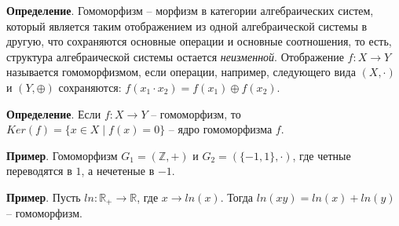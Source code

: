 \documentclass[a4paper]{book}
\begin{document}
\textbf{Определение}. Гомоморфизм -- морфизм в категории алгебраических систем, который является таким отображением из одной алгебраической системы в другую, что сохраняются основные операции и основные соотношения, то есть, структура алгебраической системы остается \textit{неизменной}. Отображение $f: X\rightarrow Y$ называется гомоморфизмом, если операции, например, следующего вида $(X,\cdot)$ и $(Y,\oplus)$ сохраняются: $f(x_1\cdot x_2) = f(x_1)\oplus f(x_2)$. 


\textbf{Определение}. Если $f: X\rightarrow Y$ -- гомоморфизм, то $Ker(f) = \{x\in X\mid f(x) = 0 \}$ -- ядро гомоморфизма $f$. 


\textbf{Пример}. Гомоморфизм $G_1 = (\mathbb{Z},+)$ и $G_2 = (\{-1,1\},\cdot)$, где четные переводятся в $1$, а нечетеные в $-1$. 

\textbf{Пример}. Пусть $ln: \mathbb{R_+}\rightarrow \mathbb{R}$, где $x \rightarrow ln(x)$. Тогда $ln(xy)=ln(x)+ln(y)$ -- гомоморфизм. 
\end{document}
